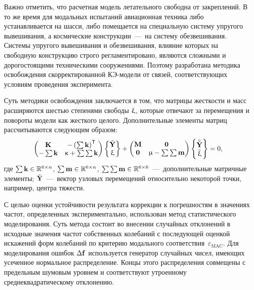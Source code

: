 Важно отметить, что расчетная модель летательного свободна от закреплений. В то же время для модальных испытаний авиационная техника либо устанавливается на шасси, либо помещается на специальную систему упругого вывешивания, а космические конструкции~---~на систему обезвешивания. Системы упругого вывешивания и обезвешивания, влияние которых на свободную конструкцию строго регламентировано, являются сложными и дорогостоящими техническими сооружениями. Поэтому разработана методика освобождения скорректированной КЭ-модели от связей, соответствующих условиям проведения эксперимента. 

Суть методики освобождения заключается в том, что матрицы жесткости и масс расширяются шестью степенями свободы $ \mathbf{\upxi} $, которые отвечают за перемещения и повороты модели как жесткого целого. Дополнительные элементы матриц рассчитываются следующим образом:
\begin{equation}
	\begin{pmatrix}
		\mathbf{K} & -\left( \sum \mathbf{k} \right) ^ \mathsf{T} \\
		 -\sum \mathbf{k} & \upkappa + \sum \sum \mathbf{k}
	\end{pmatrix}
	\begin{Bmatrix}
		\tilde{\mathbf{Y}} \\
		\upxi
	\end{Bmatrix}
	+
	\begin{pmatrix}
		\mathbf{M} & \mathbf{0} \\
		\mathbf{0} & \upmu - \sum \sum \mathbf{m}
	\end{pmatrix}
		\begin{Bmatrix}
		\ddot{\tilde{\mathbf{Y}}} \\
		\ddot{\upxi}
	\end{Bmatrix}
	= 0,
\end{equation}
где $ \sum \mathbf{k} \in \mathbb{R}^{6 \times n}$, $ \sum \mathbf{m} \in \mathbb{R}^{6 \times n}$, $ \sum \sum \mathbf{m} \in \mathbb{R}^{6 \times 6} $~---~дополнительные матричные элементы; $ \tilde{\mathbf{Y}} $~---~вектор узловых перемещений относительно некоторой точки, например, центра тяжести.

С целью оценки устойчивости результата коррекции к погрешностям в значениях частот, определенных экспериментально, использован метод статистического моделирования. Суть метода состоит во внесении случайных отклонений в исходные значения частот собственных колебаний с последующей оценкой искажений форм колебаний по критерию модального соответствия~$ \varepsilon_{\mathrm{MAC}} $. Для моделирования ошибок $\Delta \mathbf{f} $ используется генератор случайных чисел, имеющих усеченное нормальное распределение. Концы этого распределения совмещены с предельным шумовым уровнем и соответствуют утроенному среднеквадратическому отклонению. 


